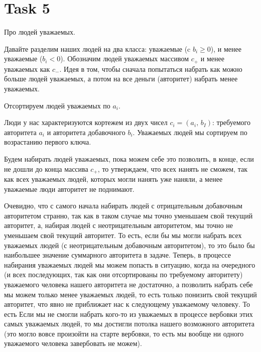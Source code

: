 \section{Task 5}
\begin{task}
    Про людей уважаемых.
\end{task}

\begin{solution}
    Давайте разделим наших людей на два класса: уважаемые (c $b_i \geq 0$), и менее уважаемые ($b_i < 0$). Обозначим людей уважаемых массивом $c_+$ и менее уважаемых как $c_-$. Идея в том, чтобы сначала попытаться набрать как можно больше людей уважаемых, а потом на все деньги (авторитет) набрать менее уважаемых.

    Отсортируем людей уважаемых по $a_i$. 
    \begin{upd}
        Люди у нас характеризуются кортежем из двух чисел $c_i = (a_i,\,b_I)$: требуемого авторитета $a_i$ и авторитета добавочного $b_i$. Уважаемых людей мы сортируем по возрастанию первого ключа.
    \end{upd}
    Будем набирать людей уважаемых, пока можем себе это позволить, в конце, если не дошли до конца массива $c_+$, то утверждаем, что всех нанять не сможем, так как всех уважаемых людей, которых могли нанять уже наняли, а менее уважаемые люди авторитет не поднимают.
    \begin{upd}
        Очевидно, что с самого начала набирать людей с отрицательным добавочным авторитетом странно, так как в таком случае мы точно уменьшаем свой текущий авторитет, а, набирая людей с неотрицательным авторитетом, мы точно не уменьшаем свой текущий авторитет.
        То есть, если бы мы могли набрать всех уважаемых людей (с неотрицательным добавочным авторитетом), то это было бы наибольшее значение суммарного авторитета в задаче.
        Теперь, в процессе набирания уважаемых людей мы можем попасть в ситуацию, когда на очередного (и всех последующих, так как они отсортированы по требуемому авторитету) уважаемого человека нашего авторитета не достаточно, а позволить набрать себе мы можем только менее уважаемых людей, то есть только понизить свой текущий авторитет, что явно не приближает нас к следующему уважаемому человеку.
        То есть Если мы не смогли набрать кого-то из уважаемых в процессе вербовки этих самых уважаемых людей, то мы достигли потолка нашего возможного авторитета (это могло вовсе произойти на старте вербовки, то есть мы вообще ни одного уважаемого человека завербовать не можем).
    \end{upd}


\end{solution}
